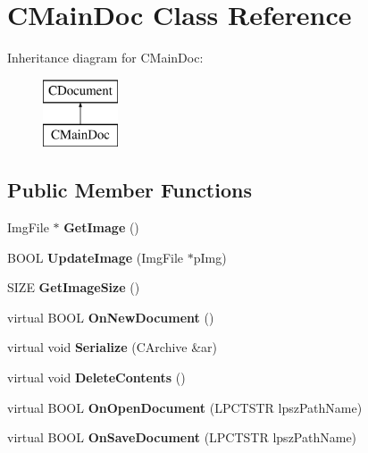 \hypertarget{class_c_main_doc}{}\section{C\+Main\+Doc Class Reference}
\label{class_c_main_doc}
Inheritance diagram for C\+Main\+Doc\+:\begin{figure}[H]
\begin{center}
\leavevmode
\includegraphics[height=2.000000cm]{class_c_main_doc}
\end{center}
\end{figure}
\subsection*{Public Member Functions}
\begin{DoxyCompactItemize}
\item 
\mbox{\label{class_c_main_doc_a76e8b5aa95766a847bb11ac63e310dcc}} 
Img\+File $\ast$ {\bfseries Get\+Image} ()
\item 
\mbox{\label{class_c_main_doc_ad1100572b5a4148e920b70268c37feb5}} 
B\+O\+OL {\bfseries Update\+Image} (Img\+File $\ast$p\+Img)
\item 
\mbox{\label{class_c_main_doc_aa9d7df83c9c244c5699f6432c5d621dc}} 
S\+I\+ZE {\bfseries Get\+Image\+Size} ()
\item 
\mbox{\label{class_c_main_doc_a126f38d2277d2836557658480fd1871b}} 
virtual B\+O\+OL {\bfseries On\+New\+Document} ()
\item 
\mbox{\label{class_c_main_doc_a602c573ee0f41036fa81f45c4640ba94}} 
virtual void {\bfseries Serialize} (C\+Archive \&ar)
\item 
\mbox{\label{class_c_main_doc_a0b20ba47b6491164edd00071d05ae0c2}} 
virtual void {\bfseries Delete\+Contents} ()
\item 
\mbox{\label{class_c_main_doc_af72ef9a0f0ea90f3447ad861cb3a34d4}} 
virtual B\+O\+OL {\bfseries On\+Open\+Document} (L\+P\+C\+T\+S\+TR lpsz\+Path\+Name)
\item 
\mbox{\label{class_c_main_doc_ae2023d992f49d22b105fc52979074136}} 
virtual B\+O\+OL {\bfseries On\+Save\+Document} (L\+P\+C\+T\+S\+TR lpsz\+Path\+Name)
\end{DoxyCompactItemize}
